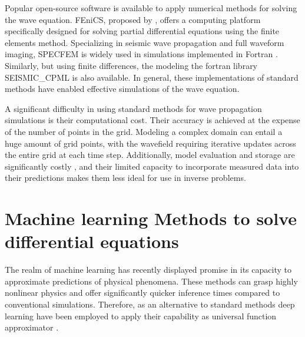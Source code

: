 \documentclass[11pt,twoside]{article}
\begin{document}
Popular open-source software is available to apply numerical methods for solving the wave equation. FEniCS, proposed by 
, offers a computing platform specifically designed for solving partial differential equations using 
the finite elements method. Specializing in seismic wave propagation and full waveform imaging, SPECFEM is widely used in simulations 
implemented in Fortran \citep{dimitri_komatitsch_2023_10415228,komatitsch_2024_10823181}. Similarly, but using finite differences, the 
modeling the fortran library SEISMIC\_CPML \citep{komatitsch_unsplit_2007} is also available. In general, these implementations of 
standard methods have enabled effective simulations of the wave equation. 

A significant difficulty in using standard methods for wave propagation simulations is their computational cost. Their accuracy is 
achieved at the expense of the number of points in the grid. Modeling a complex domain can entail a huge amount of grid points, with 
the wavefield requiring iterative updates across the entire grid at each time step. Additionally, model evaluation and storage are 
significantly costly , and their limited capacity to incorporate measured data into their 
predictions makes them less ideal for use in inverse problems.

\section{Machine learning Methods to solve differential equations}\label{sec:dl_mwpm}

The realm of machine learning has recently displayed promise in its capacity to approximate predictions of physical phenomena. These methods 
can grasp highly nonlinear physics and offer significantly quicker inference times compared to conventional simulations. Therefore, as an 
alternative to standard methods deep learning have been employed to apply their capability as universal function approximator 
\citep{hornik_approximation_1991}.
\end{document}
